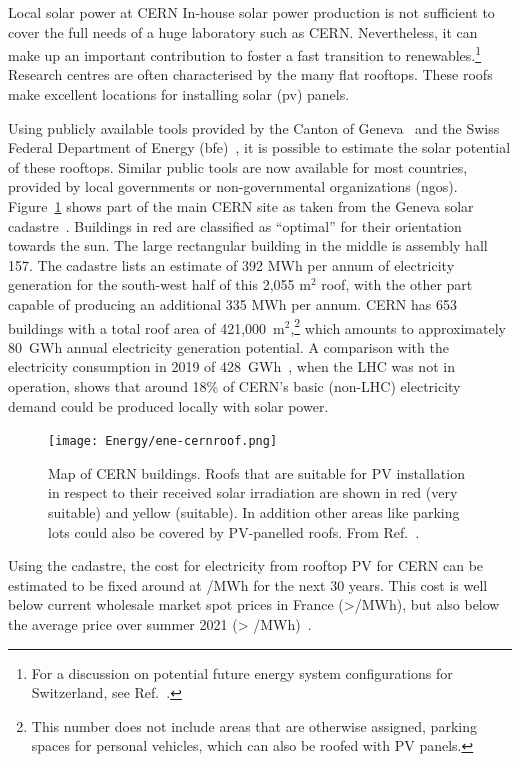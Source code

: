 \documentclass[../SustainableHEP.tex]{subfiles}
\begin{document}
\begin{casestudy}{Local solar power at CERN}%
    In-house solar power production is not sufficient to cover the full needs of a huge laboratory such as CERN. Nevertheless, it can make up an important contribution to foster a fast transition to renewables.\footnote{For a discussion on potential future energy system configurations for Switzerland, see Ref.~\cite{Zuettel}.} Research centres are often characterised by the many flat rooftops. These roofs make excellent locations for installing solar (\acrshort{pv}) panels. 

    Using publicly available tools provided by the Canton of Geneva~\cite{SIG} and the Swiss Federal Department of Energy (\acrshort{bfe})~\cite{BFE}, it is possible to estimate the solar potential of these rooftops. Similar public tools are now available for most countries, provided by local governments or non-governmental organizations (\acrshort{ngo}s). Figure~\ref{fig:ene-cernroof} shows part of the main CERN site as taken from the Geneva solar cadastre~\cite{SIG}. Buildings in red are classified as “optimal” for their orientation towards the sun. The large rectangular building in the middle is assembly hall 157. The cadastre lists an estimate of 392 MWh per annum of electricity generation for the south-west half of this 2,055 m$^2$ roof, with the other part capable of producing an additional 335 MWh per annum. CERN has 653 buildings with a total roof area of 421,000~m$^2$,\footnote{This number does not include areas that are otherwise assigned, \eg parking spaces for personal vehicles, which can also be roofed with PV panels.} which amounts to approximately 80~GWh annual electricity generation potential. A comparison with the electricity consumption in 2019 of 428~GWh~\cite{Environment:2737239}, when the LHC was not in operation, shows that around 18\% of CERN’s basic (non-LHC) electricity demand could be produced locally with solar power.

    \begin{figure}
    \captionsetup{type=figure}
    \texttt{[image: Energy/ene-cernroof.png]}
    \caption[CERN roofs suitable for solar cells]%
        {Map of CERN buildings. Roofs that are suitable for PV installation in respect to their received solar irradiation are shown in red (very suitable) and yellow (suitable). In addition other areas like \eg parking lots could also be covered by PV-panelled roofs. From Ref.~\cite{SIG}.\label{fig:ene-cernroof}}
    \end{figure}

    Using the cadastre, the cost for electricity from rooftop PV for CERN can be estimated to be fixed around at /MWh for the next 30 years. This cost is well below current wholesale market spot prices in France (>/MWh), but also below the average price over summer 2021 (> /MWh)~\cite{FranceMix}.
\end{casestudy}
\end{document}
